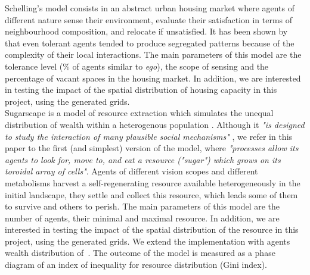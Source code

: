 \documentclass[Royal,sageh,times]{sagej}
\begin{document}
Schelling's model consists in an abstract urban housing market where agents of different nature sense their environment, evaluate their satisfaction in terms of neighbourhood composition, and relocate if unsatisfied. It has been shown by \cite{Schelling1969} that even tolerant agents tended to produce segregated patterns because of the complexity of their local interactions. The main parameters of this model are the tolerance level (\% of agents similar to {\it ego}), the scope of sensing and the percentage of vacant spaces in the housing market. In addition, we are interested in testing the impact of the spatial distribution of housing capacity in this project, using the generated grids. \\

Sugarscape is a model of resource extraction which simulates the unequal distribution of wealth within a heterogenous population \citep{EpsteinAxtell1996}. Although it {\it "is designed to study the interaction of many plausible social mechanisms"} \citep[p.125]{Axtelletal1996}, we refer in this paper to the first (and simplest) version of the model, where {\it "processes allow its agents to look for, move to, and eat a resource ("sugar") which grows on its toroidal array of cells"}. Agents of different vision scopes and different metabolisms harvest a self-regenerating resource available heterogeneously in the initial landscape, they settle and collect this resource, which leads some of them to survive and others to perish. The main parameters of this model are the number of agents, their minimal and maximal resource. In addition, we are interested in testing the impact of the spatial distribution of the resource in this project, using the generated grids. We extend the implementation with agents wealth distribution of~\citet{li2009netlogo}. The outcome of the model is measured as a phase diagram of an index of inequality for resource distribution (Gini index). 
\end{document}
